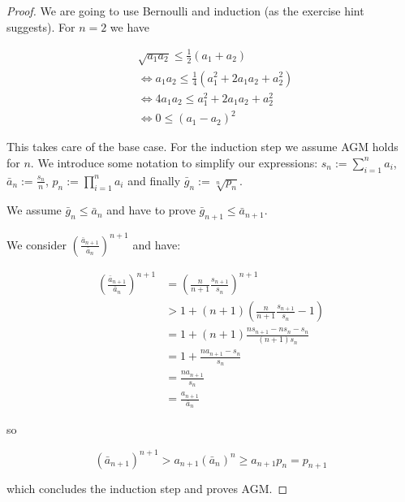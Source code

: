 \begin{proof}
We are going to use Bernoulli and induction (as the exercise hint suggests). For $n = 2$ we have

\begin{align*}
& \sqrt{a_1 a_2} \leq \frac{1}{2} (a_1 + a_2) \\
&\Leftrightarrow a_1 a_2 \leq \frac{1}{4} (a_1^2 + 2 a_1 a_2 + a_2^2) \\
&\Leftrightarrow 4 a_1 a_2 \leq a_1^2 + 2 a_1 a_2 + a_2^2 \\
&\Leftrightarrow 0 \leq (a_1 - a_2)^2
\end{align*}

This takes care of the base case. For the induction step we assume AGM holds for $n$. We introduce some notation to simplify our expressions: $s_n := \sum_{i = 1}^n a_i$, $\bar{a}_n := \frac{s_n}{n}$, $p_n := \prod_{i = 1}^n a_i$ and finally $\bar{g}_n := \sqrt[n]{p_n}$.

We assume $\bar{g}_n \leq \bar{a}_n$ and have to prove $\bar{g}_{n+1} \leq \bar{a}_{n+1}$.

We consider $(\frac{\bar{a}_{n+1}}{\bar{a}_n})^{n+1}$ and have:

\begin{align*}
(\frac{\bar{a}_{n+1}}{\bar{a}_n})^{n+1} &= (\frac{n}{n+1} \frac{s_{n+1}}{s_n})^{n+1} \\
 &> 1 + (n + 1) (\frac{n}{n+1} \frac{s_{n+1}}{s_n} - 1) \\
 &= 1 + (n + 1) \frac{n s_{n+1} - n s_n - s_n}{(n+1) s_n} \\
 &= 1 + \frac{n a_{n+1} - s_n}{s_n} \\
 &= \frac{n a_{n+1}}{s_n} \\
 &= \frac{a_{n+1}}{\bar{a}_n}
\end{align*}

so 

$$
(\bar{a}_{n+1})^{n+1} > a_{n+1} (\bar{a}_n)^n \geq  a_{n+1} p_n = p_{n+1}
$$

which concludes the induction step and proves AGM.
\end{proof}
